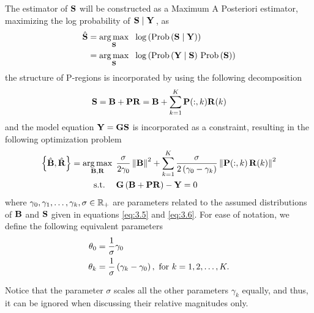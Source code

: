 The estimator of $\mathbf{S}$ will be constructed as a Maximum A Posteriori estimator, maximizing the log probability of $\left. \mathbf{S} \;\middle|\; \mathbf{Y} \right.$, as
\begin{align}
    \hat{\mathbf{S}} &= 
    \operatorname*{arg\,max}_{\mathbf{S} }\, 
    \phantom{.}
    \log\left( 
    \text{Prob}\left(  \mathbf{S} \;\middle|\; \mathbf{Y}  \right) \right)
    \nonumber \\
    &=
    \operatorname*{arg\,max}_{\mathbf{S} }\, 
    \phantom{.}
    \log \left( 
    \text{Prob}\left(  \mathbf{Y} \;\middle|\; \mathbf{S}  \right)\,  \text{Prob}\left(  \mathbf{S}  \right)  \right)
\end{align}
the structure of P-regions is incorporated by using the following decomposition
\begin{equation}
    {\mathbf{S}} = {\mathbf{B}} + \mathbf{P} {\mathbf{R}}
    = {\mathbf{B}} + \sum_{k=1}^K \mathbf{P}(:,k) {\mathbf{R}}(k)
    \label{eq:3.7_v2}
\end{equation}
and the model equation $\mathbf{Y} = \mathbf{G} \mathbf{S}$ is incorporated as a constraint, resulting in the following optimization problem
\begin{align}
    \left\{  \hat{\mathbf{B}}, \hat{\mathbf{R}}  \right\} 
    =
    \operatorname*{arg\,max}_{\mathbf{B}, \mathbf{R} }\, 
    &\phantom{.}
    \frac{\sigma}{2 \gamma_0} \left\lVert \mathbf{B} \right\rVert^2
    +
    \sum_{k=1}^K \frac{\sigma}{2\left( \gamma_0-\gamma_k \right) } \left\lVert \mathbf{P}(:,k)\, \mathbf{R}(k) \right\rVert^2
    \nonumber \\
    \text{s.t.}
    \quad
    &\phantom{.}
    {\mathbf{G} \left( \mathbf{B} + \mathbf{P} \mathbf{R} \right) } - \mathbf{Y} = 0
    \label{eq:3.7}
\end{align}
where $\gamma_0, \gamma_1, \dots, \gamma_k, \sigma \in \mathbb{R}_+$ are parameters related to the assumed distributions of $\mathbf{B}$ and $\mathbf{S}$ given in equations \eqref{eq:3.5} and \eqref{eq:3.6}.
%
For ease of notation, we define the following equivalent parameters
\begin{align}
    \theta_0 &= \frac{1}{\sigma} \gamma_0 \\
    \theta_k &= \frac{1}{\sigma} \left(  \gamma_k- \gamma_0  \right),
    \text{ for } k = 1, 2, \dots, K.
\end{align}

Notice that the parameter $\sigma$ scales all the other parameters $\gamma_k$ equally, and thus, it can be ignored when discussing their relative magnitudes only.

%

